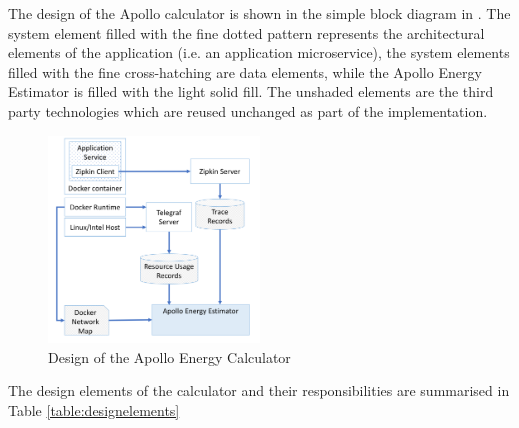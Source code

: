 The design of the Apollo calculator is shown in the simple block diagram in . The system element filled with the fine dotted pattern represents the architectural elements of the application (i.e. an application microservice), the system elements filled with the fine cross-hatching are data elements, while the Apollo Energy Estimator is filled with the light solid fill.  The unshaded elements are the third party technologies which are reused unchanged as part of the implementation.

\begin{figure}
\centering
\includegraphics[width=0.5\textwidth]{Figures/implementation-design}
\caption{Design of the Apollo Energy Calculator}
\label{figure:implementation}
\end{figure}

The design elements of the calculator and their responsibilities are summarised in Table \ref{table:designelements}

